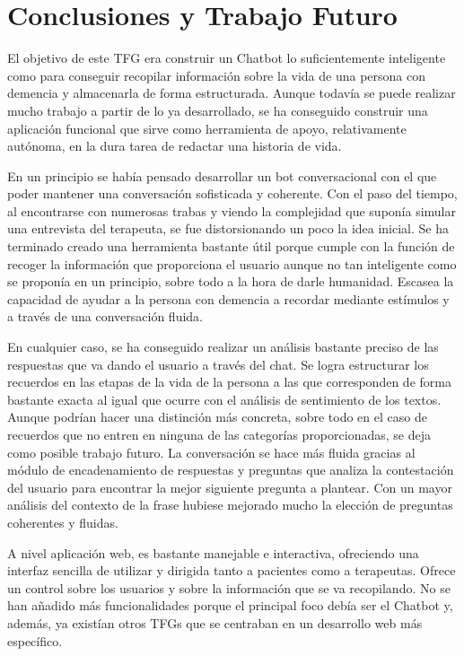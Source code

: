 \chapter{Conclusiones y Trabajo Futuro}
\label{cap:conclusiones}

El objetivo de este TFG era construir un Chatbot lo suficientemente inteligente como para conseguir recopilar información sobre la vida de una persona con demencia y almacenarla de forma estructurada. Aunque todavía se puede realizar mucho trabajo a partir de lo ya desarrollado, se ha conseguido construir una aplicación funcional que sirve como herramienta de apoyo, relativamente autónoma, en la dura tarea de redactar una historia de vida. 

En un principio se había pensado desarrollar un bot conversacional con el que poder mantener una conversación sofisticada y coherente. Con el paso del tiempo, al encontrarse con numerosas trabas y viendo la complejidad que suponía simular una entrevista del terapeuta, se fue distorsionando un poco la idea inicial. Se ha terminado creado una herramienta bastante útil porque cumple con la función de recoger la información que proporciona el usuario aunque no tan inteligente como se proponía en un principio, sobre todo a la hora de darle humanidad. Escasea la capacidad de ayudar a la persona con demencia a recordar mediante estímulos y a través de una conversación fluida. 

En cualquier caso, se ha conseguido realizar un análisis bastante preciso de las respuestas que va dando el usuario a través del chat. Se logra estructurar los recuerdos en las etapas de la vida de la persona a las que corresponden de forma bastante exacta al igual que ocurre con el análisis de sentimiento de los textos. Aunque podrían hacer una distinción más concreta, sobre todo en el caso de recuerdos que no entren en ninguna de las categorías proporcionadas, se deja como posible trabajo futuro. La conversación se hace más fluida gracias al módulo de encadenamiento de respuestas y preguntas que analiza la contestación del usuario para encontrar la mejor siguiente pregunta a plantear. Con un mayor análisis del contexto de la frase hubiese mejorado mucho la elección de preguntas coherentes y fluidas.

A nivel aplicación web, es bastante manejable e interactiva, ofreciendo una interfaz sencilla de utilizar y  dirigida tanto a pacientes como a terapeutas. Ofrece un control sobre los usuarios y sobre la información que se va recopilando. No se han añadido más funcionalidades porque el principal foco debía ser el Chatbot y, además, ya existían otros TFGs que se centraban en un desarrollo web más específico. 


